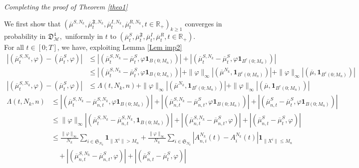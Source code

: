 \documentclass[notitlepage,reqno,11pt]{amsart}
\numberwithin{equation}{section}
\def\R{\mathbb{R}}
\begin{document}
\vfill
\eject

{\it Completing the proof of Theorem \ref{theo1}}

\smallskip

We  first  show that   $(\overline{\mu}^{S,N_k}, \overline{\mu}_t^{\mathfrak{F},N_k},\overline{\mu}_t^{I,N_k},\overline{\mu}_t^{R,N_k},  t\in \R_+)_{k \geq 1}$ converges in probability in $\mathfrak{D}^4_{\mathcal{M}},$ uniformly in $t$   to  $(\overline{\mu}_t^{S}, \overline{\mu}_t^{\mathfrak{F}},\overline{\mu}_t^{I},\overline{\mu}_t^{R}, t\in \R_+)$.\\
For all $t\in[0;T]$, we have, exploiting Lemma \ref{Lem imp2}
\begin{align}
\left|( \overline{\mu}_{t}^{S,N_k},\varphi )-( \overline{\mu}_{t}^{S},\varphi )\right|&\leq\left|( \overline{\mu}_{t}^{S,N_k}- \overline{\mu}_{t}^{S},\varphi \mathbf{1}_{B(0;M_n) })\right|+\left|( \overline{\mu}_{t}^{S,N_k}- \overline{\mu}_{t}^{S},\varphi \mathbf{1}_{B^c(0;M_n) })\right|\nonumber\\
&\leq \left|( \overline{\mu}_{t}^{S,N_k}- \overline{\mu}_{t}^{S},\varphi \mathbf{1}_{B(0;M_n) })\right|+\|\varphi\|_{\infty}\left|( \overline{\mu}^{N_k}, \mathbf{1}_{B^c(0;M_n) })\right|+\|\varphi\|_{\infty}\left|( \overline{\mu}, \mathbf{1}_{B^c(0;M_n) })\right|\nonumber\\
\label{pr1eq1}
\left|( \overline{\mu}_{t}^{S,N_k},\varphi )-( \overline{\mu}_{t}^{S},\varphi )\right|&\leq  \Lambda (t,N_k,n)+\|\varphi\|_{\infty}\left|( \overline{\mu}^{N_k}, \mathbf{1}_{B^c(0;M_n) })\right|+\|\varphi\|_{\infty}\left|( \overline{\mu}, \mathbf{1}_{B^c(0;M_n) })\right|
\end{align}
\begin{align}
  \Lambda (t,N_k,n) &\leq \left|( \overline{\mu}_{t}^{S,N_k}- \overline{\mu}_{n,t}^{S,N_k},\varphi \mathbf{1}_{B(0;M_n) })\right|+\left|(  \overline{\mu}_{n,t}^{S,N_k}- \overline{\mu}_{n,t}^{S},\varphi \mathbf{1}_{B(0;M_n) })\right|+\left|(  \overline{\mu}_{n,t}^{S}- \overline{\mu}_{t}^{S},\varphi \mathbf{1}_{B(0;M_n) })\right|\nonumber\\
  &\leq \|\varphi\|_{\infty}\left|( \overline{\mu}_{t}^{S,N_k}- \overline{\mu}_{n,t}^{S,N_k},\mathbf{1}_{B(0;M_n) })\right|+\left|(  \overline{\mu}_{n,t}^{S,N_k}- \overline{\mu}_{n,t}^{S},\varphi )\right|+\left|(  \overline{\mu}_{n,t}^{S}- \overline{\mu}_{t}^{S},\varphi )\right|\nonumber\\
  &\leq \frac{\|\varphi\|_{\infty}}{N_k}\sum_{i\in \mathfrak{S}_{N_k}}\mathbf{1}_{\|X^i\|>M_n}+\frac{\|\varphi\|_{\infty}}{N_k}\sum_{i\in\mathfrak{S}_{N_k}}\left|A_{n,i}^{N_k}(t)-A_{i}^{N_k}(t)\right|\mathbf{1}_{\|X^i\|\leq M_n}\nonumber\\
  \label{pr1eq2}
  &\quad+\left|(  \overline{\mu}_{n,t}^{S,N_k}- \overline{\mu}_{n,t}^{S},\varphi )\right|+\left|(  \overline{\mu}_{n,t}^{S}- \overline{\mu}_{t}^{S},\varphi )\right|
\end{align}
\end{document}
